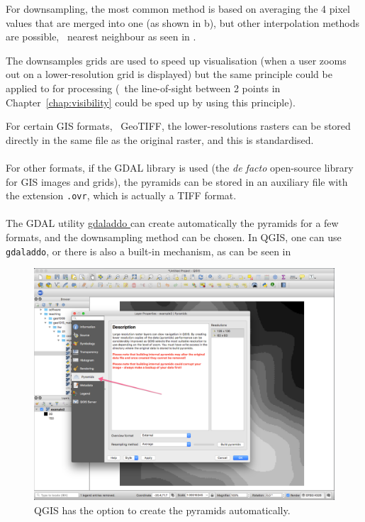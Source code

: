 %

For downsampling, the most common method is based on averaging the 4 pixel values that are merged into one (as shown in b), but other interpolation methods are possible, \eg\ nearest neighbour as seen in .

%

The downsamples grids are used to speed up visualisation (when a user zooms out on a lower-resolution grid is displayed) but the same principle could be applied to for processing (\eg\ the line-of-sight between 2 points in Chapter~\ref{chap:visibility} could be sped up by using this principle).

\begin{floatbox}
\begin{kaobox-practice}[frametitle=\faCog\ How does it work in practice?]
  For certain GIS formats, \eg\ GeoTIFF, the lower-resolutions rasters can be stored directly in the same file as the original raster, and this is standardised.
  \\ \\
  For other formats, if the GDAL library is used (the \emph{de facto} open-source library for GIS images and grids), the pyramids can be stored in an auxiliary file with the extension \texttt{.ovr}, which is actually a TIFF format.
  \\ \\
  The GDAL utility \href{https://www.gdal.org/gdaladdo.html}{gdaladdo \faExternalLink} can create automatically the pyramids for a few formats, and the downsampling method can be chosen.
  In QGIS, one can use \texttt{gdaladdo}, or there is also a built-in mechanism, as can be seen in 
\end{kaobox-practice}
\end{floatbox}

\begin{figure}
  \centering
  \includegraphics[width=\linewidth]{figs/qgis}
  \caption{QGIS has the option to create the pyramids automatically.}%
%
\end{figure}



